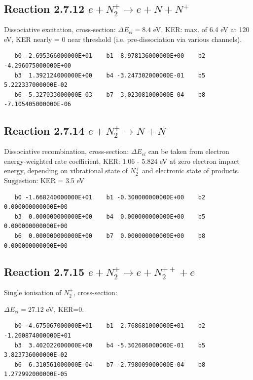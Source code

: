 \documentclass[12pt,dvipdfmx]{article}
\begin{document}
\subsection{
Reaction 2.7.12  $e + N_2^+ \rightarrow e + N + N^+ $ }
Dissociative excitation, cross-section:
\cite{kn:Bahati}
$\Delta E_{el} = 8.4 $ eV, KER: max. of 6.4 eV at 120 eV, KER nearly = 0 near threshold (i.e.
pre-dissociation via various channels).

\begin{small}\begin{verbatim}
   b0 -2.695366000000E+01    b1  8.978136000000E+00    b2 -4.296075000000E+00
   b3  1.392124000000E+00    b4 -3.247302000000E-01    b5  5.222337000000E-02
   b6 -5.327033000000E-03    b7  3.023081000000E-04    b8 -7.105405000000E-06
\end{verbatim}\end{small}

\subsection{
Reaction 2.7.14  $e + N_2^+ \rightarrow N + N$ }
Dissociative recombination, cross-section:
\cite{kn:Petersen}
$\Delta E_{el}$ can be taken from electron energy-weighted rate coefficient. KER: 1.06 - 5.824 eV at zero electron impact energy,
depending on vibrational state of $N_2^+$ and electronic state of products. Suggestion: KER = 3.5 eV

\begin{small}\begin{verbatim}
   b0 -1.668240000000E+01    b1 -0.300000000000E+00    b2  0.000000000000E+00
   b3  0.000000000000E+00    b4  0.000000000000E+00    b5  0.000000000000E+00
   b6  0.000000000000E+00    b7  0.000000000000E+00    b8  0.000000000000E+00
\end{verbatim}\end{small}



\subsection{
Reaction 2.7.15  $e + N_2^+ \rightarrow e + N_2^{++} +e$ }
Single ionisation of $N_2^+$, cross-section: \cite{kn:Bahati}

$\Delta E_{el} = 27.12 $ eV,  KER=0.

\begin{small}\begin{verbatim}
   b0 -4.675067000000E+01    b1  2.768681000000E+01    b2 -1.260874000000E+01
   b3  3.402022000000E+00    b4 -5.302686000000E-01    b5  3.823736000000E-02
   b6  6.310561000000E-04    b7 -2.798009000000E-04    b8  1.272992000000E-05
\end{verbatim}\end{small}
\end{document}
